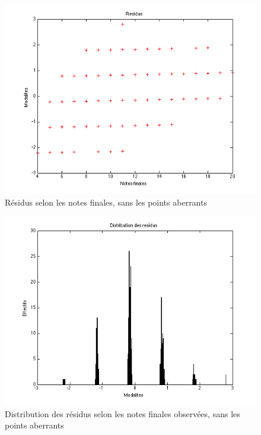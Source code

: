 \documentclass[11pt]{article}
\begin{document}
\begin{figure}[h]
\centering
\includegraphics[scale=0.6]{Images/fig17.png}
\caption{Résidus selon les notes finales, sans les points aberrants}
\end{figure}

\begin{figure}[h]
\centering
\includegraphics[scale=0.6]{Images/fig18.png}
\caption{Distribution des résidus selon les notes finales observées, sans les points aberrants}
\end{figure}
\end{document}
